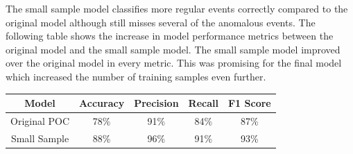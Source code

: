 \documentclass[a4paper,11pt]{article}
\begin{document}
The small sample model classifies more regular events correctly compared to the original model although still misses several of the anomalous events. The following table shows the increase in model performance metrics between the original model and the small sample model. The small sample model improved over the original model in every metric. This was promising for the final model which increased the number of training samples even further.
\begin{center}
\begin{tabular}{ |c|c|c|c|c| } 
 \hline
 Model & Accuracy & Precision & Recall & F1 Score \\ \hline
 Original POC & 78\% & 91\% & 84\% & 87\% \\
 Small Sample & 88\% & 96\% & 91\% & 93\% \\
 \hline
\end{tabular}
\end{center}
\end{document}

